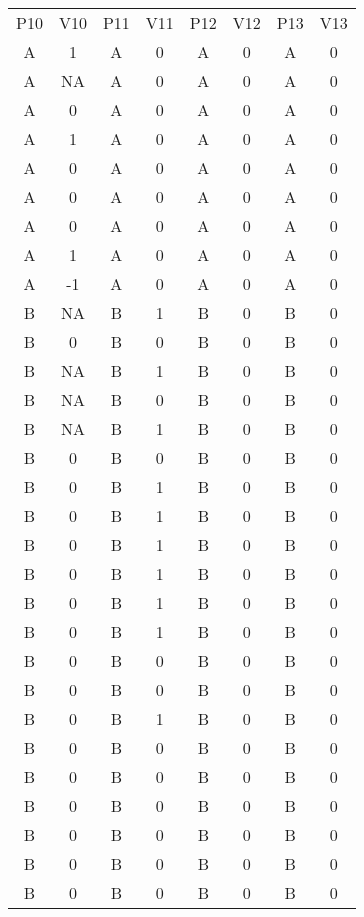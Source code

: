 \documentclass{jote-article}
\begin{document}
  \begin{table}

  \label{Table 3}\caption{}
  \begin{tabular}{c  c  c  c  c  c  c  c}

  P10 & V10 & P11 & V11 & P12 & V12 & P13 & V13 & \\
A & 1 & A & 0 & A & 0 & A & 0 & \\
A & NA & A & 0 & A & 0 & A & 0 & \\
A & 0 & A & 0 & A & 0 & A & 0 & \\
A & 1 & A & 0 & A & 0 & A & 0 & \\
A & 0 & A & 0 & A & 0 & A & 0 & \\
A & 0 & A & 0 & A & 0 & A & 0 & \\
A & 0 & A & 0 & A & 0 & A & 0 & \\
A & 1 & A & 0 & A & 0 & A & 0 & \\
A & -1 & A & 0 & A & 0 & A & 0 & \\
B & NA & B & 1 & B & 0 & B & 0 & \\
B & 0 & B & 0 & B & 0 & B & 0 & \\
B & NA & B & 1 & B & 0 & B & 0 & \\
B & NA & B & 0 & B & 0 & B & 0 & \\
B & NA & B & 1 & B & 0 & B & 0 & \\
B & 0 & B & 0 & B & 0 & B & 0 & \\
B & 0 & B & 1 & B & 0 & B & 0 & \\
B & 0 & B & 1 & B & 0 & B & 0 & \\
B & 0 & B & 1 & B & 0 & B & 0 & \\
B & 0 & B & 1 & B & 0 & B & 0 & \\
B & 0 & B & 1 & B & 0 & B & 0 & \\
B & 0 & B & 1 & B & 0 & B & 0 & \\
B & 0 & B & 0 & B & 0 & B & 0 & \\
B & 0 & B & 0 & B & 0 & B & 0 & \\
B & 0 & B & 1 & B & 0 & B & 0 & \\
B & 0 & B & 0 & B & 0 & B & 0 & \\
B & 0 & B & 0 & B & 0 & B & 0 & \\
B & 0 & B & 0 & B & 0 & B & 0 & \\
B & 0 & B & 0 & B & 0 & B & 0 & \\
B & 0 & B & 0 & B & 0 & B & 0 & \\
B & 0 & B & 0 & B & 0 & B & 0 & \\


\end{tabular}


\end{table}
\end{document}
